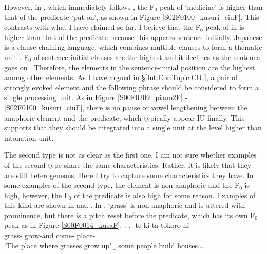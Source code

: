 However, in \Last[b], which immediately follows \Last[a],
the F$_{0}$ peak of  `medicine' is higher than that of the predicate  `put on',
as shown in Figure \ref{S02F0100_kusuri_ciuF}.
This contrasts with what I have claimed so far.
I believe that the F$_{0}$ peak of  in \Last[b] is higher than that of the predicate because this appears sentence-initially.
Japanese is a clause-chaining language,
which combines multiple clauses to form a thematic unit \cite{longacre85,martin92,givon01}.
F$_{0}$ of sentence-initial clauses are the highest and it declines as the sentence goes on \cite{koisoishimoto12,ishimotokoiso12,ishimotokoiso13}.
Therefore,
the elements in the sentence-initial position are the highest among other elements.
As I have argued in \S \ref{Int:Cor:Topic:CIU},
a pair of strongly evoked element and the following phrase should be considered to form a single processing unit.
As in Figure \ref{S00F0209_piano2F} - \ref{S02F0100_kusuri_ciuF},
there is no pause or vowel lengthening between the anaphoric element and the predicate,
which typically appear IU-finally.
This supports that they should be integrated into a single unit at the level higher than intonation unit.


The second type is not as clear as the first one.
I am not sure whether examples of the second type share the same characteristics.
Rather, it is likely that they are still heterogeneous.
Here I try to capture some characteristics they have.
In some examples of the second type,
the element is non-anaphoric and the F$_{0}$ is high,
however, the F$_{0}$ of the predicate is also high for some reason.
Examples of this kind are shown in \Next and \NNext.
In \Next,  `grass' is non-anaphoric and is uttered with prominence,
but there is a pitch reset before the predicate, which has its own F$_{0}$ peak as in Figure \ref{S00F0014_kusaF}.
%
\ex.\label{S00F0014_kusa}
 \ag.  \tp{\dvline} -te ki-ta \tp{\dvline} tokoro-ni \tp{\dvline} \\
 		grass- {} grow-and come- {} place- {} \\
		`The place where grasses grow up'
 \b. some people build houses...

